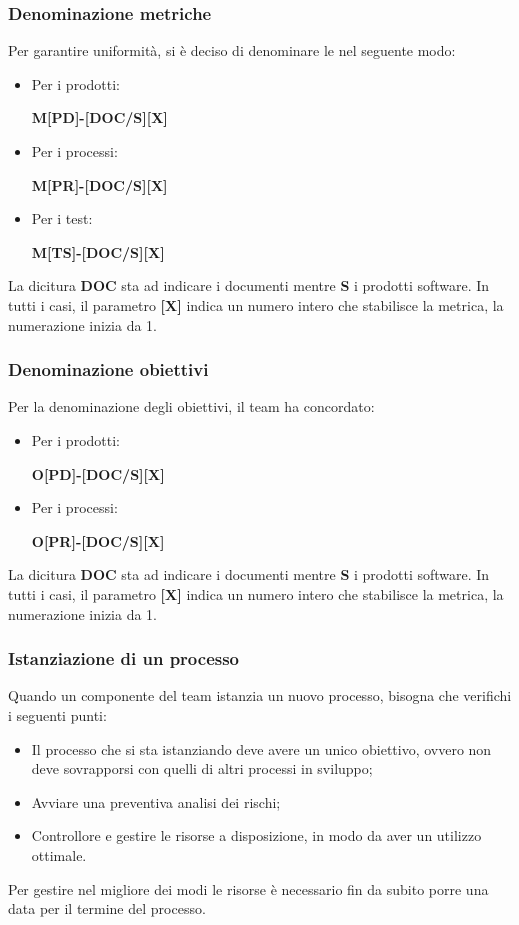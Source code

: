 \subsubsection{Denominazione metriche}
Per garantire uniformità, si è deciso di denominare le  nel seguente modo:
\begin{itemize}
    \item Per i prodotti:
          \begin{center}
              \textbf{M[PD]-[DOC/S][X]}
          \end{center}
    \item Per i processi:
          \begin{center}
              \textbf{M[PR]-[DOC/S][X]}
          \end{center}
    \item Per i test:
          \begin{center}
              \textbf{M[TS]-[DOC/S][X]}
          \end{center}
\end{itemize}
La dicitura \textbf{DOC} sta ad indicare i documenti mentre \textbf{S} i prodotti software.
In tutti i casi, il parametro \textbf{[X]} indica un numero intero che stabilisce la metrica, la numerazione inizia da 1.

\subsubsection{Denominazione obiettivi}
Per la denominazione degli obiettivi, il team ha concordato:
\begin{itemize}
    \item Per i prodotti:
          \begin{center}
              \textbf{O[PD]-[DOC/S][X]}
          \end{center}
    \item Per i processi:
          \begin{center}
              \textbf{O[PR]-[DOC/S][X]}
          \end{center}
\end{itemize}
La dicitura \textbf{DOC} sta ad indicare i documenti mentre \textbf{S} i prodotti software.
In tutti i casi, il parametro \textbf{[X]} indica un numero intero che stabilisce la metrica, la numerazione inizia da 1.

\subsubsection{Istanziazione di un processo}
Quando un componente del team istanzia un nuovo processo, bisogna che verifichi i seguenti punti:
\begin{itemize}
    \item Il processo che si sta istanziando deve avere un unico obiettivo,  ovvero non deve sovrapporsi con quelli di altri processi  in sviluppo;
    \item Avviare una preventiva analisi dei rischi;
    \item Controllore e gestire le risorse a disposizione, in modo da aver un utilizzo ottimale.
\end{itemize}
Per gestire nel migliore dei modi le risorse è necessario fin da subito porre una data per il termine del processo.
